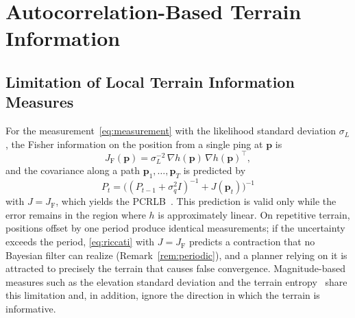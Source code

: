 \documentclass[letterpaper, 10 pt, journal, twoside]{IEEEtran}
\newcommand{\bp}{\mathbf{p}}
\newcommand{\JF}{J_{\mathrm{F}}}
\begin{document}
\section{Autocorrelation-Based Terrain Information}
\label{sec:info}

\subsection{Limitation of Local Terrain Information Measures}
For the measurement~\eqref{eq:measurement} with the likelihood standard deviation $\sigma_L$, the Fisher information on the position from a single ping at $\bp$ is
\begin{equation}
  \JF(\bp) = \sigma_L^{-2}\,\nabla h(\bp)\,\nabla h(\bp)^\top,
  \label{eq:fisher}
\end{equation}
and the covariance along a path $\bp_1, \ldots, \bp_T$ is predicted by
\begin{equation}
  P_t = \big( (P_{t-1} + \sigma_q^2 I)^{-1} + J(\bp_t) \big)^{-1}
  \label{eq:riccati}
\end{equation}
with $J = \JF$, which yields the PCRLB~\cite{tichavsky1998posterior, bergman1999terrain}. This prediction is valid only while the error remains in the region where $h$ is approximately linear. On repetitive terrain, positions offset by one period produce identical measurements; if the uncertainty exceeds the period, \eqref{eq:riccati} with $J = \JF$ predicts a contraction that no Bayesian filter can realize (Remark~\ref{rem:periodic}), and a planner relying on it is attracted to precisely the terrain that causes false convergence. Magnitude-based measures such as the elevation standard deviation and the terrain entropy~\cite{wang2015construction} share this limitation and, in addition, ignore the direction in which the terrain is informative.
\end{document}
